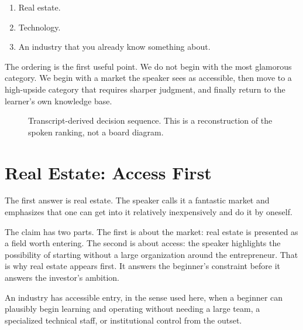 \begin{enumerate}
\item Real estate.
\item Technology.
\item An industry that you already know something about.
\end{enumerate}

The ordering is the first useful point. We do not begin with the most glamorous category. We begin with a market the speaker sees as accessible, then move to a high-upside category that requires sharper judgment, and finally return to the learner's own knowledge base.

\begin{figure}
\centering
{}
\caption{Transcript-derived decision sequence. This is a reconstruction of the spoken ranking, not a board diagram.}
\end{figure}

\section{Real Estate: Access First}

The first answer is real estate. The speaker calls it a fantastic market and emphasizes that one can get into it relatively inexpensively and do it by oneself.

The claim has two parts. The first is about the market: real estate is presented as a field worth entering. The second is about access: the speaker highlights the possibility of starting without a large organization around the entrepreneur. That is why real estate appears first. It answers the beginner's constraint before it answers the investor's ambition.

\begin{definition}
An industry has accessible entry, in the sense used here, when a beginner can plausibly begin learning and operating without needing a large team, a specialized technical staff, or institutional control from the outset.
\end{definition}

